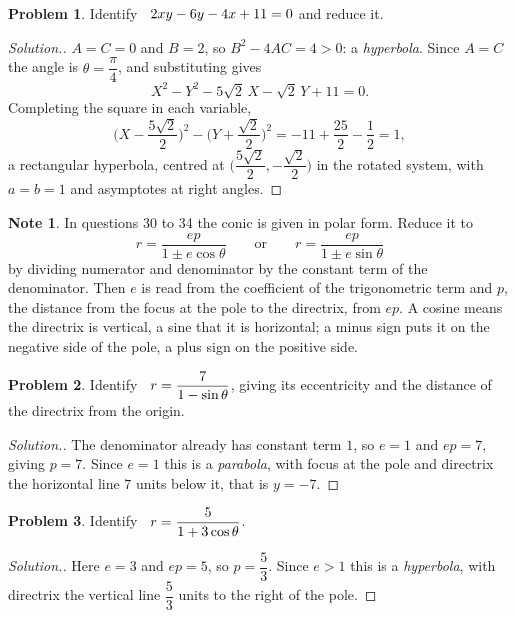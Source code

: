 \documentclass[11pt,a4paper]{article}
\theoremstyle{definition}
\newtheorem*{note}{Note}
\newtheorem{problemx}{Problem}[subsection]
\newenvironment{problem}{\begin{problemx}}{\end{problemx}}
\newenvironment{solution}
  {\renewcommand{\qedsymbol}{}\begin{proof}[\textit{Solution}.]}
  {\end{proof}}
\begin{document}
\begin{problem}
Identify $\hspace{0.2cm} 2xy - 6y - 4x + 11 = 0$ and reduce it.
\end{problem}
\begin{solution}
$A = C = 0$ and $B = 2$, so $B^2 - 4AC = 4 > 0$: a \emph{hyperbola}. Since
$A = C$ the angle is $\theta = \dfrac{\pi}{4}$, and substituting gives
$$X^2 - Y^2 - 5\sqrt2\,X - \sqrt2\,Y + 11 = 0 .$$
Completing the square in each variable,
$$\Big(X - \frac{5\sqrt2}{2}\Big)^2 - \Big(Y + \frac{\sqrt2}{2}\Big)^2
= -11 + \frac{25}{2} - \frac{1}{2} = 1 ,$$
a rectangular hyperbola, centred at
$\Big(\dfrac{5\sqrt2}{2}, -\dfrac{\sqrt2}{2}\Big)$ in the rotated system, with
$a = b = 1$ and asymptotes at right angles.
\end{solution}

\begin{note}
In questions 30 to 34 the conic is given in polar form. Reduce it to
$$r = \frac{ep}{1 \pm e\cos\theta}\qquad\text{or}\qquad
r = \frac{ep}{1 \pm e\sin\theta}$$
by dividing numerator and denominator by the constant term of the denominator.
Then $e$ is read from the coefficient of the trigonometric term and $p$, the
distance from the focus at the pole to the directrix, from $ep$. A cosine means
the directrix is vertical, a sine that it is horizontal; a minus sign puts it on
the negative side of the pole, a plus sign on the positive side.
\end{note}

\begin{problem}
Identify $\hspace{0.2cm} r = \dfrac{7}{1 - \sin\theta}$, giving its eccentricity
and the distance of the directrix from the origin.
\end{problem}
\begin{solution}
The denominator already has constant term $1$, so $e = 1$ and $ep = 7$, giving
$p = 7$. Since $e = 1$ this is a \emph{parabola}, with focus at the pole and
directrix the horizontal line $7$ units below it, that is $y = -7$.
\end{solution}

\begin{problem}
Identify $\hspace{0.2cm} r = \dfrac{5}{1 + 3\cos\theta}$.
\end{problem}
\begin{solution}
Here $e = 3$ and $ep = 5$, so $p = \dfrac{5}{3}$. Since $e > 1$ this is a
\emph{hyperbola}, with directrix the vertical line $\dfrac{5}{3}$ units to the
right of the pole.
\end{solution}
\end{document}
